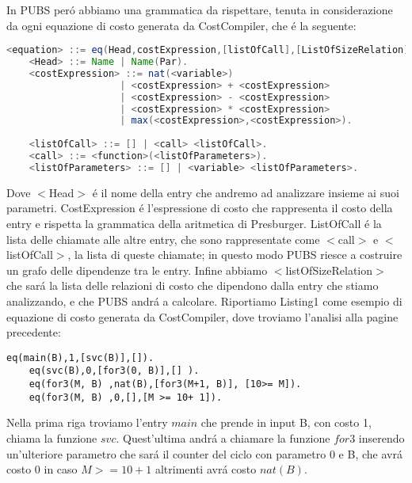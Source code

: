 \documentclass[../../main.tex]{subfiles}
\begin{document}
In PUBS peró abbiamo una grammatica da rispettare, tenuta in considerazione da ogni equazione di costo generata da CostCompiler, che é la seguente:
\begin{lstlisting}[language=Java, caption={Grammatica PUBS}]
    <equation> ::= eq(Head,costExpression,[listOfCall],[ListOfSizeRelation]).
    <Head> ::= Name | Name(Par).
    <costExpression> ::= nat(<variable>) 
                    | <costExpression> + <costExpression> 
                    | <costExpression> - <costExpression> 
                    | <costExpression> * <costExpression> 
                    | max(<costExpression>,<costExpression>).
                    
    <listOfCall> ::= [] | <call> <listOfCall>.
    <call> ::= <function>(<listOfParameters>).
    <listOfParameters> ::= [] | <variable> <listOfParameters>.
\end{lstlisting}
Dove $<$Head$>$ é il nome della entry che andremo ad analizzare insieme ai suoi parametri.
CostExpression é l'espressione di costo che rappresenta il costo della entry e rispetta la grammatica della aritmetica di Presburger.
ListOfCall é la lista delle chiamate alle altre entry, che sono rappresentate come $<$call$>$ e $<$listOfCall$>$, la lista di queste chiamate; in questo modo PUBS riesce a costruire un grafo delle dipendenze tra le entry.
Infine abbiamo $<$listOfSizeRelation$>$ che sará la lista delle relazioni di costo che dipendono dalla entry che stiamo analizzando, e che PUBS andrá a calcolare.
Riportiamo Listing1 come esempio di equazione di costo generata da CostCompiler, dove troviamo l'analisi alla pagine precedente:
\begin{lstlisting}[caption={Equazione di costo PUBS per Listing6}]
    eq(main(B),1,[svc(B)],[]).
    eq(svc(B),0,[for3(0, B)],[] ).
    eq(for3(M, B) ,nat(B),[for3(M+1, B)], [10>= M]).
    eq(for3(M, B) ,0,[],[M >= 10+ 1]).
\end{lstlisting}

Nella prima riga troviamo l'entry $main$ che prende in input B, con costo 1, chiama la funzione $svc$.
Quest'ultima andrá a chiamare la funzione $for3$ inserendo un'ulteriore parametro che sará il counter del ciclo con parametro 0 e B, che avrá costo 0 in caso $M >= 10 + 1$ altrimenti avrá costo $nat(B)$. 
\end{document}
